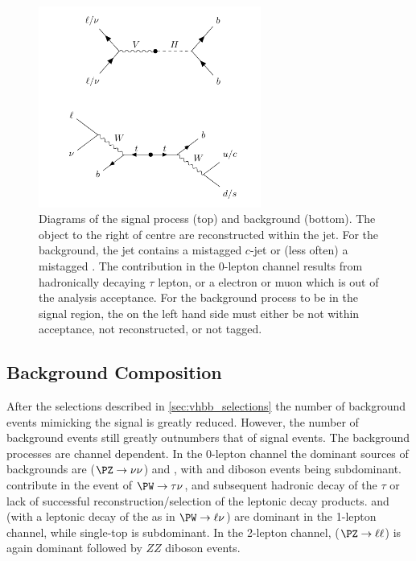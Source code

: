 %
\begin{figure}[!htbp]
  \centering
  \includegraphics[width=0.65\textwidth]{chapters/6.vhbb_boosted/figs/sr_cr_diagrams.pdf}
  \caption{
    Diagrams of the signal process (top) and \ttbar background (bottom).
    The object to the right of centre are reconstructed within the \largeR jet.
    For the \ttbar background, the \largeR jet contains a mistagged $c$-jet or (less often) a mistagged \ljet.
    The contribution in the 0-lepton channel results from hadronically decaying $\tau$ lepton, or a electron or muon which is out of the analysis acceptance.
    For the \ttbar background process to be in the signal region, the \bjet on the left hand side must either be not within acceptance, not reconstructed, or not tagged.
  }
  \label{fig:sr_cr_diagrams}
\end{figure}
%

\subsection{Background Composition}\label{sec:vebb_background_composition}

After the selections described in \cref{sec:vhbb_selections} the number of background events mimicking the \VHbb signal is greatly reduced.
However, the number of background events still greatly outnumbers that of signal events.
The background processes are channel dependent.
In the 0-lepton channel the dominant sources of backgrounds are \Zjets ($\Zboson \to \nu\nu$) and \ttbar, with \Wjets and diboson events being subdominant.
\Wjets contribute in the event of $\Wboson \to \tau\nu$, and subsequent hadronic decay of the $\tau$ or lack of successful reconstruction/selection of the leptonic decay products.
\ttbar and \Wjets (with a leptonic decay of the \Wboson as in $\Wboson \to \ell\nu$) are dominant in the 1-lepton channel, while single-top is subdominant.
In the 2-lepton channel, \Zjets ($\Zboson \to \ell\ell$) is again dominant followed by $ZZ$ diboson events.

